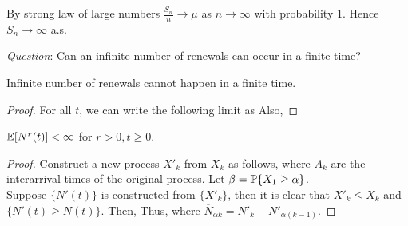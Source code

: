 \documentclass[all-lectures.tex]{subfiles}
\begin{document}
\begin{prop}
By strong law of large numbers $\frac{S_n}{n} \to \mu$ as $n \to \infty$ with probability 1. Hence $S_n \rightarrow \infty$ a.s.
\end{prop}

\textit{Question}: Can an infinite number of renewals can occur in a finite time?

\begin{prop}
Infinite number of renewals cannot happen in a finite time.
\end{prop}
\begin{proof}
For all $t$, we can write the following limit as
Also, 
\end{proof}
\begin{prop}
$\E[N^r(t)] < \infty$ for $r > 0, t \ge 0$.
\end{prop}
\begin{proof}
Construct a new process $X'_k$ from $X_k$ as follows,
where $A_k$ are the interarrival times of the original process. Let $\beta = \P\{X_1\geq \alpha\}$.\\
\indent Suppose $\{N'(t)\}$ is constructed from $\{X'_k\}$, then it is clear that $X'_k \le X_k$ and $\{N'(t) \ge N(t)\}$.
Then, 
Thus,
where $\overline{N}_{\alpha k} = N'_k-N'_{\alpha(k-1)}$. 
\end{proof}
\end{document}
